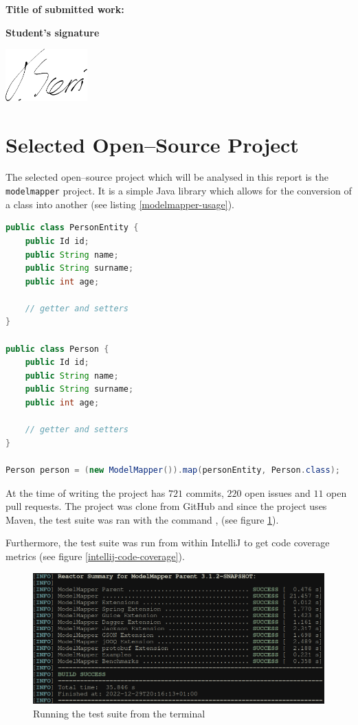 \documentclass[12pt]{article}
\newcommand{\modelmapper}{\texttt{modelmapper}\xspace}
\DeclareRobustCommand{\ul}[1]{%
	\uline{\phantom{#1}}%
	\llap{\contour{white}{#1}}%
}
\begin{document}
\vspace{2cm}

\textbf{Title of submitted work:} \ul{CPS2002 Code Analysis}

\vspace{2cm}

\textbf{Student's signature} \medskip

\underline{\includegraphics[height=2cm]{images/sig.png}} \medskip

\section{Selected Open--Source Project}

The selected open--source project which will be analysed in this
report is the \modelmapper project. It is a simple Java library
which allows for the conversion of a class into another (see
listing \ref{modelmapper-usage}).

\begin{lstlisting}[language=Java, caption={Using the
\modelmapper library}, label={modelmapper-usage}]
public class PersonEntity {
    public Id id;
    public String name;
    public String surname;
    public int age;

    // getter and setters
}

public class Person {
    public Id id;
    public String name;
    public String surname;
    public int age;

    // getter and setters
}

Person person = (new ModelMapper()).map(personEntity, Person.class);
\end{lstlisting}

At the time of writing the project has $721$ commits, $220$ open
issues and $11$ open pull requests. The project was clone from
GitHub and since the project uses Maven, the test suite was ran
with the command , (see figure
\ref{running-test-suite}).

Furthermore, the test suite was run from within IntelliJ to get
code coverage metrics (see figure \ref{intellij-code-coverage}).

\begin{figure}[H]
    \centering
    \includegraphics[width=14cm]{images/test-suite.png}
    \caption{Running the test suite from the terminal}
    \label{running-test-suite}
\end{figure}
\end{document}
